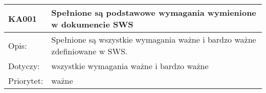 
\begin{center}

\begin{tabular}{|m{3cm}|m{9cm}|} \hline

KA001 & Spełnione są podstawowe wymagania wymienione w dokumencie SWS \\ \hline
Opis: & Spełnione są wszystkie wymagania ważne i bardzo ważne zdefiniowane w SWS. \\ \hline
Dotyczy: & wszystkie wymagania ważne i bardzo ważne \\ \hline
Priorytet: & ważne  \\ \hline %

\end{tabular}

\end{center}

